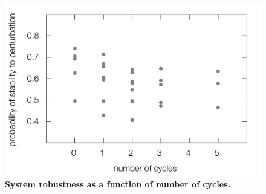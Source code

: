 \pagebreak

\begin{figure}[!ht]
\centering
\noindent\includegraphics[width=0.8\columnwidth]{fig/cycle3x3.pdf}
\caption{{\bf System robustness as a function of number of cycles.} }
\label{fig:cycle3x3}
\end{figure}






